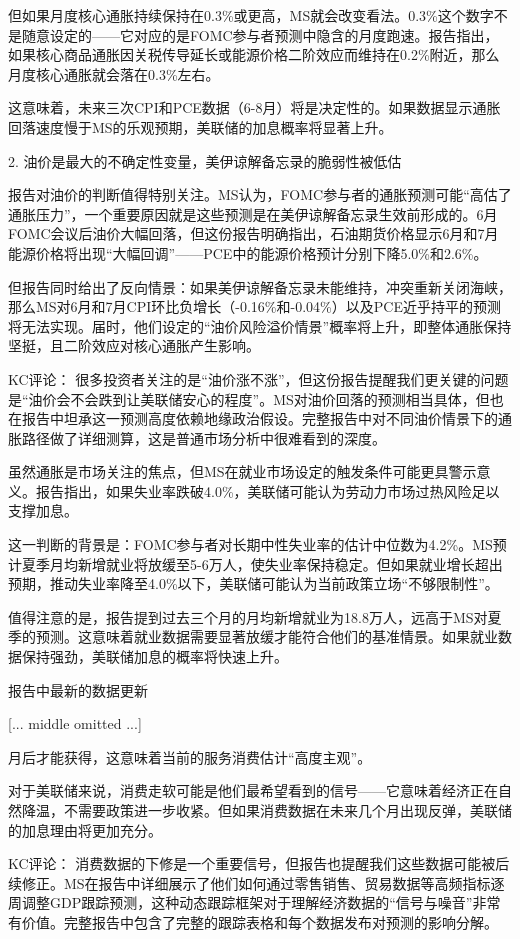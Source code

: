 \documentclass[11pt]{ctexart}
\begin{document}
但如果月度核心通胀持续保持在0.3\%或更高，MS就会改变看法。0.3\%这个数字不是随意设定的——它对应的是FOMC参与者预测中隐含的月度跑速。报告指出，如果核心商品通胀因关税传导延长或能源价格二阶效应而维持在0.2\%附近，那么月度核心通胀就会落在0.3\%左右。

这意味着，未来三次CPI和PCE数据（6-8月）将是决定性的。如果数据显示通胀回落速度慢于MS的乐观预期，美联储的加息概率将显著上升。

2. 油价是最大的不确定性变量，美伊谅解备忘录的脆弱性被低估

报告对油价的判断值得特别关注。MS认为，FOMC参与者的通胀预测可能“高估了通胀压力”，一个重要原因就是这些预测是在美伊谅解备忘录生效前形成的。6月FOMC会议后油价大幅回落，但这份报告明确指出，石油期货价格显示6月和7月能源价格将出现“大幅回调”——PCE中的能源价格预计分别下降5.0\%和2.6\%。

但报告同时给出了反向情景：如果美伊谅解备忘录未能维持，冲突重新关闭海峡，那么MS对6月和7月CPI环比负增长（-0.16\%和-0.04\%）以及PCE近乎持平的预测将无法实现。届时，他们设定的“油价风险溢价情景”概率将上升，即整体通胀保持坚挺，且二阶效应对核心通胀产生影响。

KC评论： 很多投资者关注的是“油价涨不涨”，但这份报告提醒我们更关键的问题是“油价会不会跌到让美联储安心的程度”。MS对油价回落的预测相当具体，但也在报告中坦承这一预测高度依赖地缘政治假设。完整报告中对不同油价情景下的通胀路径做了详细测算，这是普通市场分析中很难看到的深度。

虽然通胀是市场关注的焦点，但MS在就业市场设定的触发条件可能更具警示意义。报告指出，如果失业率跌破4.0\%，美联储可能认为劳动力市场过热风险足以支撑加息。

这一判断的背景是：FOMC参与者对长期中性失业率的估计中位数为4.2\%。MS预计夏季月均新增就业将放缓至5-6万人，使失业率保持稳定。但如果就业增长超出预期，推动失业率降至4.0\%以下，美联储可能认为当前政策立场“不够限制性”。

值得注意的是，报告提到过去三个月的月均新增就业为18.8万人，远高于MS对夏季的预测。这意味着就业数据需要显著放缓才能符合他们的基准情景。如果就业数据保持强劲，美联储加息的概率将快速上升。

报告中最新的数据更新

[... middle omitted ...]

月后才能获得，这意味着当前的服务消费估计“高度主观”。

对于美联储来说，消费走软可能是他们最希望看到的信号——它意味着经济正在自然降温，不需要政策进一步收紧。但如果消费数据在未来几个月出现反弹，美联储的加息理由将更加充分。

KC评论： 消费数据的下修是一个重要信号，但报告也提醒我们这些数据可能被后续修正。MS在报告中详细展示了他们如何通过零售销售、贸易数据等高频指标逐周调整GDP跟踪预测，这种动态跟踪框架对于理解经济数据的“信号与噪音”非常有价值。完整报告中包含了完整的跟踪表格和每个数据发布对预测的影响分解。
\end{document}
